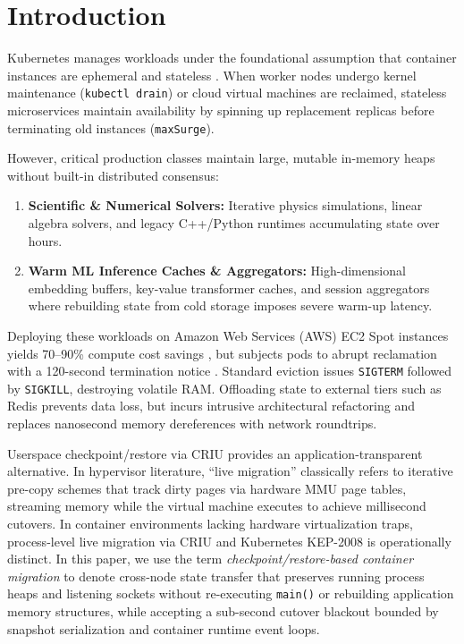 \documentclass[conference,10pt]{IEEEtran}
\begin{document}
\section{Introduction}
Kubernetes manages workloads under the foundational assumption that container instances are ephemeral and stateless \cite{burns2016borg}. When worker nodes undergo kernel maintenance (\texttt{kubectl drain}) or cloud virtual machines are reclaimed, stateless microservices maintain availability by spinning up replacement replicas before terminating old instances (\texttt{maxSurge}).

However, critical production classes maintain large, mutable in-memory heaps without built-in distributed consensus:
\begin{enumerate}
    \item \textbf{Scientific \& Numerical Solvers:} Iterative physics simulations, linear algebra solvers, and legacy C++/Python runtimes accumulating state over hours.
    \item \textbf{Warm ML Inference Caches \& Aggregators:} High-dimensional embedding buffers, key-value transformer caches, and session aggregators where rebuilding state from cold storage imposes severe warm-up latency.
\end{enumerate}

Deploying these workloads on Amazon Web Services (AWS) EC2 Spot instances yields 70--90\% compute cost savings \cite{netflix_spot, sharma2016flint}, but subjects pods to abrupt reclamation with a 120-second termination notice \cite{aws_spot}. Standard eviction issues \texttt{SIGTERM} followed by \texttt{SIGKILL}, destroying volatile RAM. Offloading state to external tiers such as Redis \cite{redis_latency} prevents data loss, but incurs intrusive architectural refactoring and replaces nanosecond memory dereferences with network roundtrips.

Userspace checkpoint/restore via CRIU \cite{criu} provides an application-transparent alternative. In hypervisor literature, ``live migration'' classically refers to iterative pre-copy schemes \cite{clark2005} that track dirty pages via hardware MMU page tables, streaming memory while the virtual machine executes to achieve millisecond cutovers. In container environments lacking hardware virtualization traps, process-level live migration via CRIU and Kubernetes KEP-2008 \cite{reber2022} is operationally distinct. In this paper, we use the term \textit{checkpoint/restore-based container migration} to denote cross-node state transfer that preserves running process heaps and listening sockets without re-executing \texttt{main()} or rebuilding application memory structures, while accepting a sub-second cutover blackout bounded by snapshot serialization and container runtime event loops.
\end{document}

